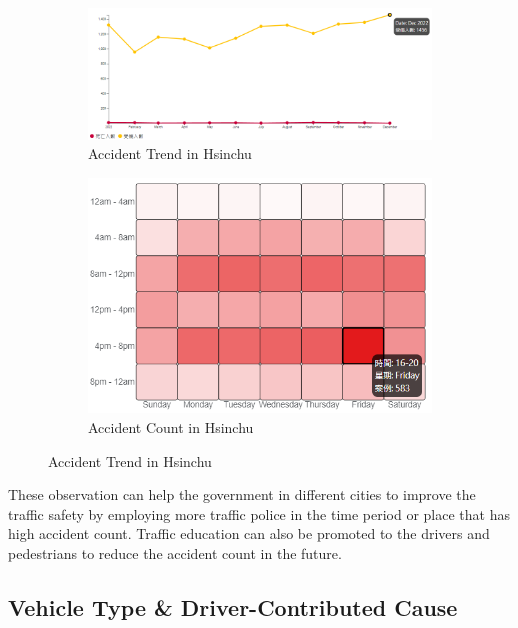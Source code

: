 \documentclass[a4paper, oneside, final, 12pt]{scrartcl} %
\begin{document}
\begin{figure}[htbp]
  \centering
  \begin{subfigure}[b]{0.6\textwidth}
      \includegraphics[width=\textwidth]{"./Image/western_line.png"}
      \caption{Accident Trend in Hsinchu}
      \label{fig: hsinchu_line}
  \end{subfigure}
  \begin{subfigure}[b]{0.35\textwidth}
      \includegraphics[width=\textwidth]{"./Image/western_heatmap.png"}
      \caption{Accident Count in Hsinchu}
      \label{fig: hsinchu_heatmap}
  \end{subfigure}
  \caption{Accident Trend in Hsinchu}
  \label{fig: hsinchu}
\end{figure}

These observation can help the government in different cities to
improve the traffic safety by employing more traffic police
in the time period or place that has high accident count.
Traffic education can also be promoted to the drivers and pedestrians
to reduce the accident count in the future.

\subsection{Vehicle Type \& Driver-Contributed Cause}
\end{document}
